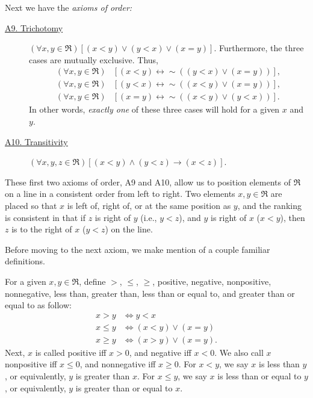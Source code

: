 Next we have the 
{\it axioms of order:}
\begin{description}
\item[\ul{A9. Trichotomy}]
 $(\forall x,y\in\Re) [(x< y)\vee(y< x)\vee(x=y)]$.  Furthermore,
	the three cases are mutually exclusive.  Thus,
\begin{align*}
	(\forall x,y\in\Re)&[(x<y)\longleftrightarrow\sim((y<x)\vee(x=y))],\\
	(\forall x,y\in\Re)&[(y<x)\longleftrightarrow\sim((x<y)\vee(x=y))],\\
	(\forall x,y\in\Re)&[(x=y)\longleftrightarrow\sim((x<y)\vee(y<x))].
\end{align*} 
In other words, {\it exactly one} of these three cases will
hold for a given $x$ and $y$. 

\item[\ul{A10. Transitivity}]
 $(\forall x,y,z\in\Re)[(x< y)\wedge(y< z)\longrightarrow (x< z)]$.
\end{description}
These first two axioms of order, A9 and A10, allow us to position
elements of $\Re$ on a line in a consistent
order from left to right.  Two elements $x,y\in\Re$
are placed so that $x$ is left of, right of, or 
at the same position as $y$, and the ranking is 
consistent in that if $z$ is right of $y$ (i.e.,
$y<z$), and $y$ is right of $x$ ($x<y$), then $z$ is to the right
of $x$ ($y<z$) on the line.


Before moving to the next axiom, we make mention of a couple
 familiar definitions.
\begin{definition} For a given $x,y\in\Re$, define
$>$, $\le$, $\ge$, {\rm positive, negative, nonpositive,
nonnegative, less than, greater than, less than or equal to},
and {\rm greater than or equal to} as follow:
\begin{align}
x>y&\iff y<x\\ x\le y&\iff (x<y)\vee(x=y)\\
x\ge y&\iff (x>y)\vee(x=y).\end{align}
Next,  $x$ is called
{\rm positive} iff $x>0$,   and {\rm negative}
iff $x<0$.   We also call $x$ {\rm nonpositive}
iff $x\le0$, and {\rm nonnegative} iff $x\ge 0$.
For $x<y$, we say $x$ is {\rm less than} $y$, or equivalently, $y$ is
{\rm greater than} $x$.  For $x\le y$, we say
$x$ is {\rm less than or equal to }$y$, or equivalently,
$y$ is {\rm greater than or equal to }$x$.
\label{TrichotomyCasesDefinitions}\end{definition} 

